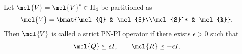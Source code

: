 
\begin{definition}
    Let $\mcl{V}=\mcl{V}^*\in\Pi_4$ be partitioned as
    \begin{equation*}
        \mcl{V}
        =
        \bmat{\mcl{Q} & \mcl{S}\\\mcl{S}^* & \mcl{R}}.
    \end{equation*}
    Then $\mcl{V}$ is called a strict PN-PI operator if there exists
    $\epsilon>0$ such that
    \begin{equation*}
        \mcl{Q}\succeq\epsilon I,
        \qquad
        \mcl{R}\preceq-\epsilon I.
    \end{equation*}
\end{definition}

